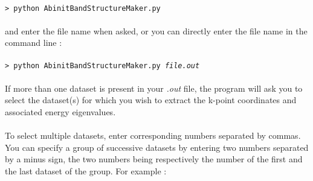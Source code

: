 \documentclass[prl]{article}
\begin{document}
\\
\texttt{> python AbinitBandStructureMaker.py} \\
\\
and enter the file name when asked, or you can directly enter the file name in the command line : \\
\\
\texttt{> python AbinitBandStructureMaker.py \textit{file.out}} \\
\\
If more than one dataset is present in your \textit{.out} file, the program will ask you to select the dataset(s) for which you wish to extract the k-point coordinates and associated energy eigenvalues. \\
\\
To select multiple datasets, enter corresponding numbers separated by commas.
You can specify a group of successive datasets by entering two numbers separated by a minus sign,
the two numbers being respectively the number of the first and the last dataset of the group. For example : \\
\end{document}

